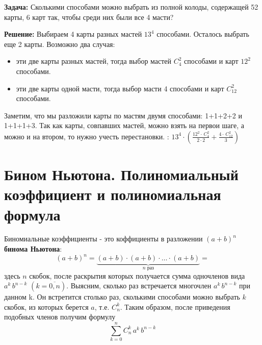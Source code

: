 \textbf{Задача:} Сколькими способами можно выбрать из полной колоды, содержащей 52 карты, 6 карт так, чтобы среди них были все 4 масти?
\par \textbf{Решение:} Выбираем 4 карты разных мастей $13^4$ способами. Осталось выбрать еще 2 карты. Возможно два случая:
\begin{itemize}
    \item эти две карты разных мастей, тогда выбор мастей ${C}_{4}^2$ способами и карт $12^2$ способами.
    \item эти две карты одной масти, тогда выбор масти 4 способами и карт ${C}_{12}^2$ способами.
\end{itemize}
Заметим, что мы разложили карты по мастям двумя способами: 1+1+2+2 и 1+1+1+3. Так как карты, совпавших мастей, можно взять на первои шаге, а можно и на втором, то нужно учесть перестановки. : $13^4\cdot(\frac{12^2\cdot \, {C}_4^2}{2\cdot 2}+\frac{4\cdot \, {C}_{12}^2}{3})$

\section{Бином Ньютона. Полиномиальный коэффициент и полиномиальная формула }

Биномиальные коэффициенты - это коффициенты в разложении $(a+b)^n$ \textbf{бинома Ньютона}:
$$(a+b)^n = \underbrace{(a+b)\cdot(a+b)\cdot\ldots\cdot(a+b)}_{n \text{ раз}}=$$
здесь $n$ скобок, после раскрытия которых получается сумма одночленов вида $a^k\, b^{n-k}$ \;\; $(k=\overline{0,n})$.
\newline Выясним, сколько раз встречается многочлен $a^k\, b^{n-k}$ при данном k. Он встретится столько раз, сколькими способами можно выбрать $k$ скобок, из которых берется $a$, т.е. ${C}_n^k$. Таким образом, после приведения подобных членов получим формулу
$$\sum_{k=0}^n{C}_n^k\,a^k\,b^{n-k}$$

